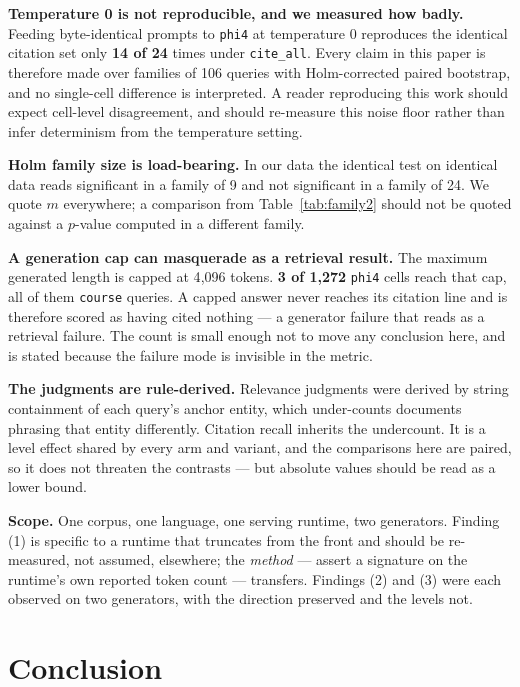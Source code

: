 \documentclass[conference]{IEEEtran}
\begin{document}
\textbf{Temperature 0 is not reproducible, and we measured how badly.} Feeding
byte-identical prompts to \texttt{phi4} at temperature 0 reproduces the identical
citation set only \textbf{14 of 24} times under \texttt{cite\_all}. Every claim in
this paper is therefore made over families of 106 queries with Holm-corrected
paired bootstrap, and no single-cell difference is interpreted. A reader
reproducing this work should expect cell-level disagreement, and should
re-measure this noise floor rather than infer determinism from the temperature
setting.

\textbf{Holm family size is load-bearing.} In our data the identical test on
identical data reads significant in a family of 9 and not significant in a family
of 24. We quote $m$ everywhere; a comparison from Table~\ref{tab:family2} should
not be quoted against a $p$-value computed in a different family.

\textbf{A generation cap can masquerade as a retrieval result.} The maximum
generated length is capped at 4{,}096 tokens. \textbf{3 of 1{,}272} \texttt{phi4}
cells reach that cap, all of them \texttt{course} queries. A capped answer never
reaches its citation line and is therefore scored as having cited nothing --- a
generator failure that reads as a retrieval failure. The count is small enough not
to move any conclusion here, and is stated because the failure mode is invisible
in the metric.

\textbf{The judgments are rule-derived.} Relevance judgments were derived by
string containment of each query's anchor entity, which under-counts documents
phrasing that entity differently. Citation recall inherits the undercount. It is a
level effect shared by every arm and variant, and the comparisons here are paired,
so it does not threaten the contrasts --- but absolute values should be read as a
lower bound.

\textbf{Scope.} One corpus, one language, one serving runtime, two generators.
Finding (1) is specific to a runtime that truncates from the front and should be
re-measured, not assumed, elsewhere; the \emph{method} --- assert a signature on
the runtime's own reported token count --- transfers. Findings (2) and (3) were
each observed on two generators, with the direction preserved and the levels not.

\section{Conclusion}
\end{document}
